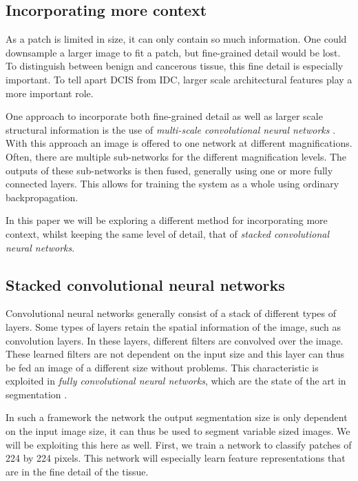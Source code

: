 \documentclass[journal]{IEEEtran}
\begin{document}
\subsection{Incorporating more context}

As a patch is limited in size, it can only contain so much information. One could downsample a larger image to fit a patch, but fine-grained detail would be lost. To distinguish between benign and cancerous tissue, this fine detail is especially important. To tell apart DCIS from IDC, larger scale architectural features play a more important role. 

One approach to incorporate both fine-grained detail as well as larger scale structural information is the use of \emph{multi-scale convolutional neural networks} \cite{multiscale_shen,buyssens2012multiscale}. With this approach an image is offered to one network at different magnifications. Often, there are multiple sub-networks for the different magnification levels. The outputs of these sub-networks is then fused, generally using one or more fully connected layers. This allows for training the system as a whole using ordinary backpropagation.

In this paper we will be exploring a different method for incorporating more context, whilst keeping the same level of detail, that of \emph{stacked convolutional neural networks}.  

\subsection{Stacked convolutional neural networks}
Convolutional neural networks generally consist of a stack of different types of layers. Some types of layers retain the spatial information of the image, such as convolution layers. In these layers, different filters are convolved over the image. These learned filters are not dependent on the input size and this layer can thus be fed an image of a different size without problems. This characteristic is exploited in \emph{fully convolutional neural networks}, which are the state of the art in segmentation \cite{long2015fully}. 

In such a framework the network the output segmentation size is only dependent on the input image size, it can thus be used to segment variable sized images. We will be exploiting this here as well. First, we train a network to classify patches of 224 by 224 pixels. This network will especially learn feature representations that are in the fine detail of the tissue. 
\end{document}
